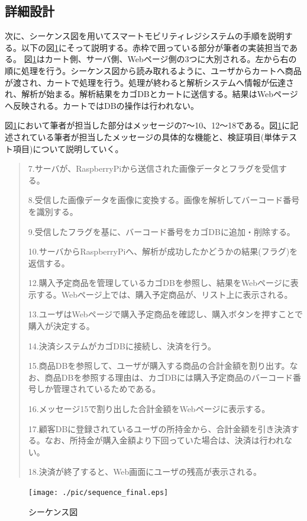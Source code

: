 \subsection*{詳細設計}
次に、シーケンス図を用いてスマートモビリティレジシステムの手順を説明する。以下の図\ref{sequence}にそって説明する。赤枠で囲っている部分が筆者の実装担当である。
図\ref{sequence}はカート側、サーバ側、Webページ側の3つに大別される。左から右の順に処理を行う。シーケンス図から読み取れるように、ユーザからカートへ商品が渡され、カートで処理を行う。処理が終わると解析システムへ情報が伝達され、解析が始まる。解析結果をカゴDBとカートに送信する。結果はWebページへ反映される。カートではDBの操作は行われない。

図\ref{sequence}において筆者が担当した部分はメッセージの7～10、12～18である。図\ref{sequence}に記述されている筆者が担当したメッセージの具体的な機能と、検証項目(単体テスト項目)について説明していく。

\newpage

\begin{quote}

7.サーバが、RaspberryPiから送信された画像データとフラグを受信する。

8.受信した画像データを画像に変換する。画像を解析してバーコード番号を識別する。

9.受信したフラグを基に、バーコード番号をカゴDBに追加・削除する。

10.サーバからRaspberryPiへ、解析が成功したかどうかの結果(フラグ)を返信する。

12.購入予定商品を管理しているカゴDBを参照し、結果をWebページに表示する。Webページ上では、購入予定商品が、リスト上に表示される。

13.ユーザはWebページで購入予定商品を確認し、購入ボタンを押すことで購入が決定する。

14.決済システムがカゴDBに接続し、決済を行う。

15.商品DBを参照して、ユーザが購入する商品の合計金額を割り出す。なお、商品DBを参照する理由は、カゴDBには購入予定商品のバーコード番号しか管理されているためである。

16.メッセージ15で割り出した合計金額をWebページに表示する。

17.顧客DBに登録されているユーザの所持金から、合計金額を引き決済する。なお、所持金が購入金額より下回っていた場合は、決済は行われない。

18.決済が終了すると、Web画面にユーザの残高が表示される。
\end{quote}

\begin{figure}[htbp]
\centering
\texttt{[image: ./pic/sequence\_final.eps]}
\caption{シーケンス図}
\label{sequence}
\end{figure}


